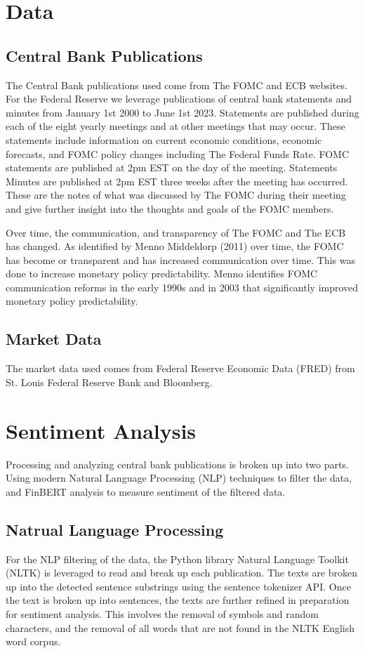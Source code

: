 \documentclass{article}
\begin{document}
\section{Data}

\subsection{Central Bank Publications}
The Central Bank publications used come from The FOMC and ECB websites. 
For the Federal Reserve we leverage publications of central bank statements and minutes from January 1st 2000 to June 1st 2023. 
Statements are published during each of the eight yearly meetings and at other meetings that may occur. 
These statements include information on current economic conditions, economic forecasts, and FOMC policy changes including The Federal Funds Rate. 
FOMC statements are published at 2pm EST on the day of the meeting. Statements Minutes are published at 2pm EST three weeks after the meeting has occurred. 
These are the notes of what was discussed by The FOMC during their meeting and give further insight into the thoughts and goals of the FOMC members. 

Over time, the communication, and transparency of The FOMC and The ECB has changed. As identified by Menno Middeldorp (2011) over time, the FOMC has become or transparent and has increased communication over time. 
This was done to increase monetary policy predictability. 
Menno identifies FOMC communication reforms in the early 1990s and in 2003 that significantly improved monetary policy predictability. 

\subsection{Market Data}
The market data used comes from Federal Reserve Economic Data (FRED) from St. Louis Federal Reserve Bank and Bloomberg. 

\section{Sentiment Analysis}
Processing and analyzing central bank publications is broken up into two parts. 
Using modern Natural Language Processing (NLP) techniques to filter the data, and FinBERT analysis to measure sentiment of the filtered data. 

\subsection{Natrual Language Processing}
For the NLP filtering of the data, the Python library Natural Language Toolkit (NLTK) is leveraged to read and break up each publication. 
The texts are broken up into the detected sentence substrings using the sentence tokenizer API. 
Once the text is broken up into sentences, the texts are further refined in preparation for sentiment analysis. 
This involves the removal of symbols and random characters, and the removal of all words that are not found in the NLTK English word corpus.  
\end{document}
